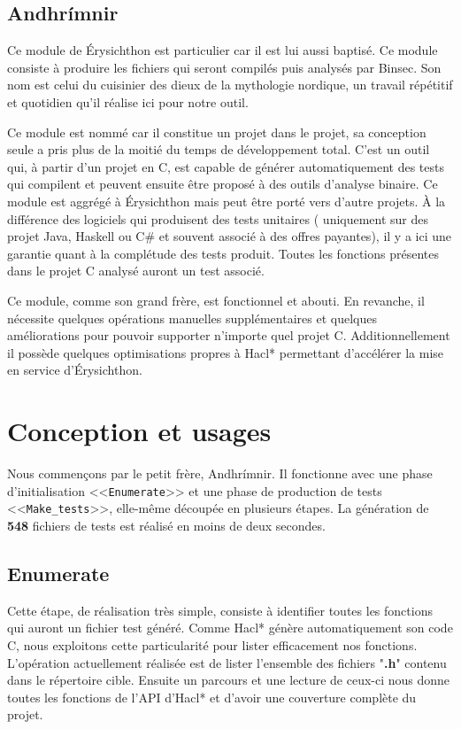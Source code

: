 \subsection*{Andhrímnir}

Ce module de Érysichthon est particulier car il est lui aussi baptisé. Ce module consiste à produire les fichiers qui seront compilés puis analysés par Binsec. Son nom est celui du cuisinier des dieux de la mythologie nordique, un travail répétitif et quotidien qu'il réalise ici pour notre outil.\smallbreak

Ce module est nommé car il constitue un projet dans le projet, sa conception seule a pris plus de la moitié du temps de développement total. C'est un outil qui, à partir d'un projet en C, est capable de générer automatiquement des tests qui compilent et peuvent ensuite être proposé à des outils d'analyse binaire. Ce module est aggrégé à Érysichthon mais peut être porté vers d'autre projets. À la différence des logiciels qui produisent des tests unitaires ( uniquement sur des projet Java, Haskell ou C\# et souvent associé à des offres payantes), il y a ici une garantie quant à la complétude des tests produit. Toutes les fonctions présentes dans le projet C analysé auront un test associé.\smallbreak

Ce module, comme son grand frère, est fonctionnel et abouti. En revanche, il nécessite quelques opérations manuelles supplémentaires et quelques améliorations pour pouvoir supporter n'importe quel projet C. Additionnellement il possède quelques optimisations propres à Hacl* permettant d'accélérer la mise en service d'Érysichthon.

\section{Conception et usages}

Nous commençons par le petit frère, Andhrímnir. Il fonctionne avec une phase d'initialisation <<\texttt{Enumerate}>> et une phase de production de tests <<\texttt{Make\_tests}>>, elle-même découpée en plusieurs étapes. La génération de \textbf{548} fichiers de tests est réalisé en moins de deux secondes.\smallbreak

\subsection*{Enumerate}

Cette étape, de réalisation très simple, consiste à identifier toutes les fonctions qui auront un fichier test généré. Comme Hacl* génère automatiquement son code C, nous exploitons cette particularité pour lister efficacement nos fonctions. L'opération actuellement réalisée est de lister l'ensemble des fichiers "\textbf{.h}" contenu dans le répertoire cible. Ensuite un parcours et une lecture de ceux-ci nous donne toutes les fonctions de l'API d'Hacl* et d'avoir une couverture complète du projet.\smallbreak

